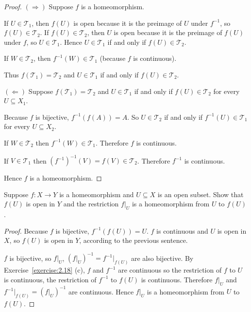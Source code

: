 \begin{proof}
	$(\Longrightarrow)$ Suppose $f$ is a homeomorphism.

	If $U\in\mathscr{T}_{1}$, then $f(U)$ is open because it is the preimage of $U$ under $f^{-1}$, so $f(U)\in\mathscr{T}_{2}$. If $f(U)\in\mathscr{T}_{2}$, then $U$ is open because it is the preimage of $f(U)$ under $f$, so $U\in\mathscr{T}_{1}$. Hence $U\in\mathscr{T}_{1}$ if and only if $f(U)\in\mathscr{T}_{2}$.

	If $W\in\mathscr{T}_{2}$, then $f^{-1}(W)\in\mathscr{T}_{1}$ (because $f$ is continuous).

	Thus $f(\mathscr{T}_{1}) = \mathscr{T}_{2}$ and $U\in\mathscr{T}_{1}$ if and only if $f(U)\in \mathscr{T}_{2}$.

	$(\Longleftarrow)$ Suppose $f(\mathscr{T}_{1}) = \mathscr{T}_{2}$ and $U\in\mathscr{T}_{1}$ if and only if $f(U)\in \mathscr{T}_{2}$ for every $U\subseteq X_{1}$.

	Because $f$ is bijective, $f^{-1}(f(A)) = A$. So $U\in\mathscr{T}_{2}$ if and only if $f^{-1}(U)\in\mathscr{T}_{1}$ for every $U\subseteq X_{2}$.

	If $W\in\mathscr{T}_{2}$ then $f^{-1}(W)\in\mathscr{T}_{1}$. Therefore $f$ is continuous.

	If $V\in\mathscr{T}_{1}$ then ${(f^{-1})}^{-1}(V) = f(V)\in \mathscr{T}_{2}$. Therefore $f^{-1}$ is continuous.

	Hence $f$ is a homeomorphism.
\end{proof}

\begin{exercise}{2.22}\label{exercise:2.22}
	Suppose $f: X\to Y$ is a homeomorphism and $U\subseteq X$ is an open subset. Show that $f(U)$ is open in $Y$ and the restriction $f\vert_{U}$ is a homeomorphism from $U$ to $f(U)$.
\end{exercise}

\begin{proof}
	Because $f$ is bijective, $f^{-1}(f(U)) = U$. $f$ is continuous and $U$ is open in $X$, so $f(U)$ is open in $Y$, according to the previous sentence.

	$f$ is bijective, so $f\vert_{U}$, ${(f\vert_{U})}^{-1} = f^{-1}\vert_{f(U)}$ are also bijective. By Exercise~\ref{exercise:2.18} (c), $f$ and $f^{-1}$ are continuous so the restriction of $f$ to $U$ is continuous, the restriction of $f^{-1}$ to $f(U)$ is continuous. Therefore $f\vert_{U}$ and $f^{-1}\vert_{f(U)} = {(f\vert_{U})}^{-1}$ are continuous. Hence $f\vert_{U}$ is a homeomorphism from $U$ to $f(U)$.
\end{proof}

